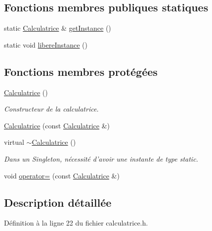 \subsection*{\-Fonctions membres publiques statiques}
\begin{DoxyCompactItemize}
\item 
static \hyperlink{class_calculatrice}{\-Calculatrice} \& \hyperlink{class_calculatrice_a6311c8e75ac47e9f43ecd47ebc22c10b}{get\-Instance} ()
\item 
static void \hyperlink{class_calculatrice_aa974f5b58c583ef3aaee055eac238466}{libere\-Instance} ()
\end{DoxyCompactItemize}
\subsection*{\-Fonctions membres protégées}
\begin{DoxyCompactItemize}
\item 
\hyperlink{class_calculatrice_a01b91f69f7ac10d737af66b3fa968db9}{\-Calculatrice} ()
\begin{DoxyCompactList}\small\item\em \-Constructeur de la calculatrice. \end{DoxyCompactList}\item 
\hyperlink{class_calculatrice_a2761ae6e08c02c2268ba5e499a013724}{\-Calculatrice} (const \hyperlink{class_calculatrice}{\-Calculatrice} \&)
\item 
virtual \hyperlink{class_calculatrice_acb4b6278eb955ce932e16df29276be52}{$\sim$\-Calculatrice} ()
\begin{DoxyCompactList}\small\item\em \-Dans un \-Singleton, nécessité d'avoir une instante de type static. \end{DoxyCompactList}\item 
void \hyperlink{class_calculatrice_ad03d57208ee06d8ebef905efbbfec7b6}{operator=} (const \hyperlink{class_calculatrice}{\-Calculatrice} \&)
\end{DoxyCompactItemize}


\subsection{\-Description détaillée}


\-Définition à la ligne 22 du fichier calculatrice.\-h.



